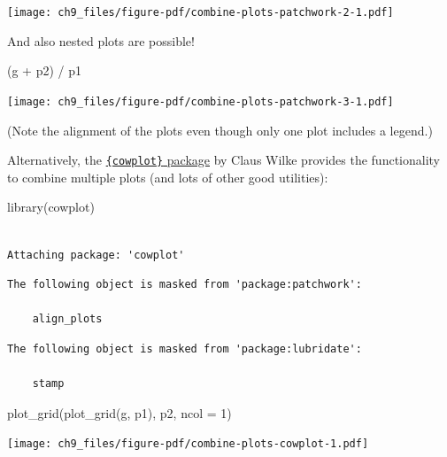 \documentclass[
  letterpaper,
]{scrbook}
\newenvironment{Shaded}{\begin{snugshade}}{\end{snugshade}}
\newcommand{\AttributeTok}[1]{\textcolor[rgb]{0.40,0.45,0.13}{#1}}
\newcommand{\DecValTok}[1]{\textcolor[rgb]{0.68,0.00,0.00}{#1}}
\newcommand{\FunctionTok}[1]{\textcolor[rgb]{0.28,0.35,0.67}{#1}}
\newcommand{\NormalTok}[1]{\textcolor[rgb]{0.00,0.23,0.31}{#1}}
\newcommand{\SpecialCharTok}[1]{\textcolor[rgb]{0.37,0.37,0.37}{#1}}
\begin{document}
\texttt{[image: ch9\_files/figure-pdf/combine-plots-patchwork-2-1.pdf]}

And also nested plots are possible!

\begin{Shaded}
\begin{Highlighting}[]
\NormalTok{(g }\SpecialCharTok{+}\NormalTok{ p2) }\SpecialCharTok{/}\NormalTok{ p1}
\end{Highlighting}
\end{Shaded}

\texttt{[image: ch9\_files/figure-pdf/combine-plots-patchwork-3-1.pdf]}

(Note the alignment of the plots even though only one plot includes a
legend.)

Alternatively, the
\href{https://wilkelab.org/cowplot/articles/introduction.html}{\texttt{\{cowplot\}}
package} by Claus Wilke provides the functionality to combine multiple
plots (and lots of other good utilities):

\begin{Shaded}
\begin{Highlighting}[]
\FunctionTok{library}\NormalTok{(cowplot)}
\end{Highlighting}
\end{Shaded}

\begin{verbatim}

Attaching package: 'cowplot'
\end{verbatim}

\begin{verbatim}
The following object is masked from 'package:patchwork':

    align_plots
\end{verbatim}

\begin{verbatim}
The following object is masked from 'package:lubridate':

    stamp
\end{verbatim}

\begin{Shaded}
\begin{Highlighting}[]
\FunctionTok{plot\_grid}\NormalTok{(}\FunctionTok{plot\_grid}\NormalTok{(g, p1), p2, }\AttributeTok{ncol =} \DecValTok{1}\NormalTok{)}
\end{Highlighting}
\end{Shaded}

\texttt{[image: ch9\_files/figure-pdf/combine-plots-cowplot-1.pdf]}
\end{document}
